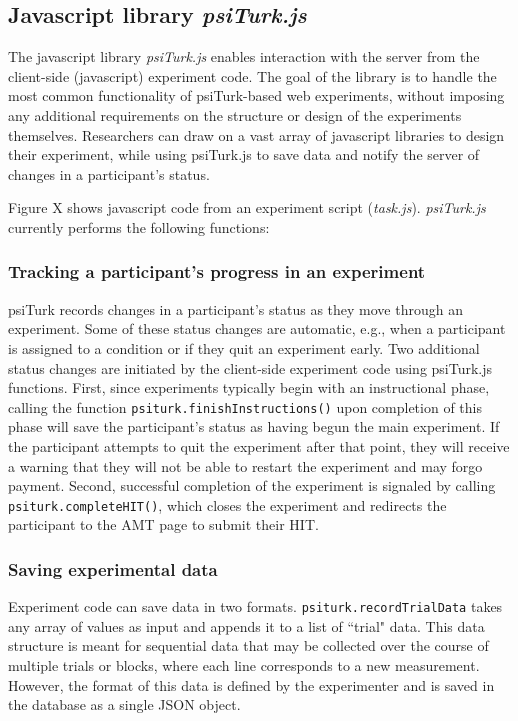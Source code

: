 \documentclass[twocolumn]{svjour3}          %
\begin{document}
\subsection{Javascript library \emph{psiTurk.js}}

The javascript library \emph{psiTurk.js} enables interaction with the server from the client-side (javascript) experiment code.
The goal of the library is to handle the most common functionality of psiTurk-based web experiments, without imposing any additional requirements on the structure or design of the experiments themselves.
Researchers can draw on a vast array of javascript libraries to design their experiment, while using psiTurk.js to save data and notify the server of changes in a participant's status.

Figure X shows javascript code from an experiment script (\emph{task.js}). 
\emph{psiTurk.js} currently performs the following functions:


\subsubsection{Tracking a participant's progress in an experiment} 

psiTurk records changes in a participant's status as they move through an experiment. 
Some of these status changes are automatic, e.g., when a participant is assigned to a condition or if they quit an experiment early. 
Two additional status changes are initiated by the client-side experiment code using psiTurk.js functions.
First, since experiments typically begin with an instructional phase, calling the function \texttt{psiturk.finishInstructions()} upon completion of this phase will save the participant's status as having begun the main experiment.
If the participant attempts to quit the experiment after that point, they will receive a warning that they will not be able to restart the experiment and may forgo payment.
Second, successful completion of the experiment is signaled by calling \texttt{psiturk.completeHIT()}, which closes the experiment and redirects the participant to the AMT page to submit their HIT.

\subsubsection{Saving experimental data} 

Experiment code can save data in two formats.
\texttt{psiturk.recordTrialData} takes any array of values as input and appends it to a list of ``trial" data.
This data structure is meant for sequential data that may be collected over the course of multiple trials or blocks, where each line corresponds to a new measurement.
However, the format of this data is defined by the experimenter and is saved in the database as a single JSON object.
\end{document}
